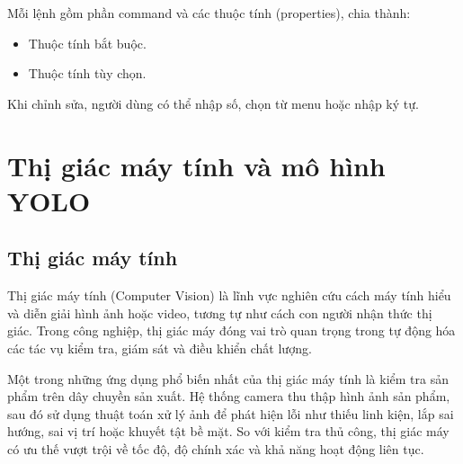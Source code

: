 Mỗi lệnh gồm phần command và các thuộc tính (properties), chia thành:
\begin{itemize}
    \item Thuộc tính bắt buộc.
    \item Thuộc tính tùy chọn.
\end{itemize}

Khi chỉnh sửa, người dùng có thể nhập số, chọn từ menu hoặc nhập ký tự.



\section{Thị giác máy tính và mô hình YOLO}
\subsection{Thị giác máy tính}
Thị giác máy tính (Computer Vision) là lĩnh vực nghiên cứu cách máy tính hiểu và diễn giải hình ảnh hoặc video, tương tự như cách con người nhận thức thị giác. Trong công nghiệp, thị giác máy đóng vai trò quan trọng trong tự động hóa các tác vụ kiểm tra, giám sát và điều khiển chất lượng.

Một trong những ứng dụng phổ biến nhất của thị giác máy tính là kiểm tra sản phẩm trên dây chuyền sản xuất. Hệ thống camera thu thập hình ảnh sản phẩm, sau đó sử dụng thuật toán xử lý ảnh để phát hiện lỗi như thiếu linh kiện, lắp sai hướng, sai vị trí hoặc khuyết tật bề mặt. So với kiểm tra thủ công, thị giác máy có ưu thế vượt trội về tốc độ, độ chính xác và khả năng hoạt động liên tục.


